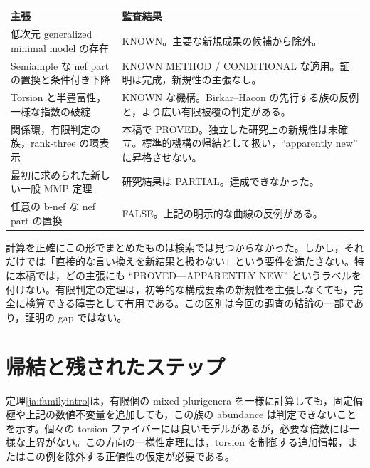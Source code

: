 \documentclass[12pt]{amsart}
\theoremstyle{definition}
\theoremstyle{remark}
\numberwithin{equation}{section}
\begin{document}
\begin{center}\small
\begin{tabular}{p{}p{}}
\toprule
主張 & 監査結果\\
\midrule
低次元 generalized minimal model の存在 & KNOWN。主要な新規成果の候補から除外。\\
Semiample な nef part の置換と条件付き下降 & KNOWN METHOD / CONDITIONAL な適用。証明は完成，新規性の主張なし。\\
Torsion と半豊富性，一様な指数の破綻 & KNOWN な機構。Birkar--Hacon の先行する族の反例と，より広い有限被覆の判定がある。\\
関係環，有限判定の族，rank-three の環表示 & 本稿で PROVED。独立した研究上の新規性は未確立。標準的機構の帰結として扱い，``apparently new'' に昇格させない。\\
最初に求められた新しい一般 MMP 定理 & 研究結果は PARTIAL。達成できなかった。\\
任意の b-nef な nef part の置換 & FALSE。上記の明示的な曲線の反例がある。\\
\bottomrule
\end{tabular}
\end{center}

計算を正確にこの形でまとめたものは検索では見つからなかった。しかし，それだけでは「直接的な言い換えを新結果と扱わない」という要件を満たさない。特に本稿では，どの主張にも ``PROVED---APPARENTLY NEW'' というラベルを付けない。有限判定の定理は，初等的な構成要素の新規性を主張しなくても，完全に検算できる障害として有用である。この区別は今回の調査の結論の一部であり，証明の gap ではない。

\section{帰結と残されたステップ}\label{ja:further}
定理\ref{ja:familyintro}は，有限個の mixed plurigenera を一様に計算しても，固定偏極や上記の数値不変量を追加しても，この族の abundance は判定できないことを示す。個々の torsion ファイバーには良いモデルがあるが，必要な倍数には一様な上界がない。この方向の一様性定理には，torsion を制御する追加情報，またはこの例を除外する正値性の仮定が必要である。
\end{document}
